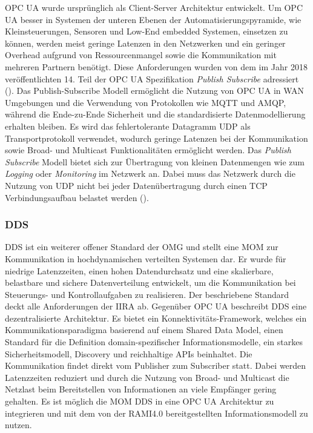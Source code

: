 \ac{OPC UA} wurde ursprünglich als Client-Server Architektur entwickelt. Um \ac{OPC UA} besser in Systemen der unteren Ebenen der Automatisierungspyramide, wie Kleinsteuerungen, Sensoren und Low-End embedded Systemen, einsetzen zu können, werden meist geringe Latenzen in den Netzwerken und ein geringer Overhead aufgrund von Ressourcenmangel sowie die Kommunikation mit mehreren Partnern benötigt. Diese Anforderungen wurden von dem im Jahr 2018 veröffentlichten 14. Teil der \ac{OPC UA} Spezifikation \textit{Publish Subscribe} adressiert (\cite{hoppe2018}). Das Publish-Subscribe Modell ermöglicht die Nutzung von \ac{OPC UA} in \ac{WAN} Umgebungen und die Verwendung von Protokollen wie \ac{MQTT} und \ac{AMQP}, während die Ende-zu-Ende Sicherheit und die standardisierte Datenmodellierung erhalten bleiben. Es wird das fehlertolerante Datagramm \ac{UDP} als Transportprotokoll verwendet, wodurch geringe Latenzen bei der Kommunikation sowie Broad- und Multicast Funktionalitäten ermöglicht werden. Das \textit{Publish Subscribe} Modell bietet sich zur Übertragung von kleinen Datenmengen wie zum \textit{Logging} oder \textit{Monitoring} im Netzwerk an. Dabei muss das Netzwerk durch die Nutzung von \ac{UDP} nicht bei jeder Datenübertragung durch einen \ac{TCP} Verbindungsaufbau belastet werden (\cite{opcpt1}).

\subsubsection{\ac{DDS}}
\ac{DDS} ist ein weiterer offener Standard der \ac{OMG} und stellt eine \ac{MOM} zur Kommunikation in hochdynamischen verteilten Systemen dar. Er wurde für niedrige Latenzzeiten, einen hohen Datendurchsatz und eine skalierbare, belastbare und sichere Datenverteilung entwickelt, um die Kommunikation bei Steuerungs- und Kontrollaufgaben zu realisieren. Der beschriebene Standard deckt alle Anforderungen der \ac{IIRA} ab. Gegenüber \ac{OPC UA} beschreibt \ac{DDS} eine dezentralisierte Architektur. Es bietet ein Konnektivitäts-Framework, welches ein Kommunikationsparadigma basierend auf einem Shared Data Model, einen Standard für die Definition domain-spezifischer Informationsmodelle, ein starkes Sicherheitsmodell, Discovery und reichhal­tige APIs beinhaltet. Die Kommunikation findet direkt vom Publisher zum Subscriber statt. Dabei werden Latenzzeiten reduziert und durch die Nutzung von Broad- und Multicast die Netzlast beim Bereitstellen von Informationen an viele Empfänger gering gehalten. Es ist möglich die \ac{MOM} \ac{DDS} in eine \ac{OPC UA} Architektur zu integrieren und mit dem von der \ac{RAMI4.0} bereitgestellten Informationsmodell zu nutzen.

